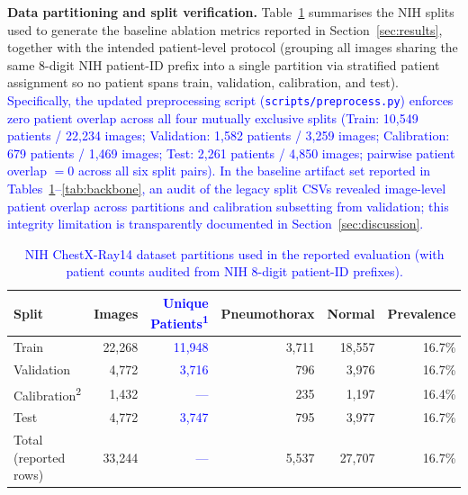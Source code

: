 \documentclass[diagnostics,article,submit,moreauthors]{Definitions/mdpi}
\newcommand{\rev}[1]{\textcolor{blue}{#1}}
\begin{document}
\textbf{Data partitioning and split verification.} Table~\ref{tab:dataset} summarises the NIH splits used to generate the baseline ablation metrics reported in Section~\ref{sec:results}, together with the intended patient-level protocol (grouping all images sharing the same 8-digit NIH patient-ID prefix into a single partition via stratified patient assignment so no patient spans train, validation, calibration, and test). \rev{Specifically, the updated preprocessing script (\texttt{scripts/preprocess.py}) enforces zero patient overlap across all four mutually exclusive splits (Train: 10,549 patients / 22,234 images; Validation: 1,582 patients / 3,259 images; Calibration: 679 patients / 1,469 images; Test: 2,261 patients / 4,850 images; pairwise patient overlap $= 0$ across all six split pairs). In the baseline artifact set reported in Tables~\ref{tab:dataset}--\ref{tab:backbone}, an audit of the legacy split CSVs revealed image-level patient overlap across partitions and calibration subsetting from validation; this integrity limitation is transparently documented in Section~\ref{sec:discussion}.}

\begin{table}[H]
\caption{\rev{NIH ChestX-Ray14 dataset partitions used in the reported evaluation (with patient counts audited from NIH 8-digit patient-ID prefixes).}}\label{tab:dataset}
\begin{tabular}{@{}lrrrrr@{}}
\toprule
Split & Images & \rev{Unique Patients\textsuperscript{1}} & Pneumothorax & Normal & Prevalence\\
\midrule
Train & 22,268 & \rev{11,948} & 3,711 & 18,557 & 16.7\%\\
Validation & 4,772 & \rev{3,716} & 796 & 3,976 & 16.7\%\\
Calibration\textsuperscript{2} & 1,432 & \rev{---} & 235 & 1,197 & 16.4\%\\
Test & 4,772 & \rev{3,747} & 795 & 3,977 & 16.7\%\\
\midrule
Total (reported rows) & 33,244 & \rev{---} & 5,537 & 27,707 & 16.7\%\\
\bottomrule
\end{tabular}
\end{table}
\end{document}
